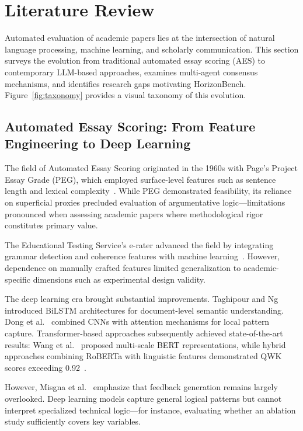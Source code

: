 \section{Literature Review}

Automated evaluation of academic papers lies at the intersection of natural language processing, machine learning, and scholarly communication. This section surveys the evolution from traditional automated essay scoring (AES) to contemporary LLM-based approaches, examines multi-agent consensus mechanisms, and identifies research gaps motivating HorizonBench. Figure~\ref{fig:taxonomy} provides a visual taxonomy of this evolution.

\subsection{Automated Essay Scoring: From Feature Engineering to Deep Learning}

The field of Automated Essay Scoring originated in the 1960s with Page's Project Essay Grade (PEG), which employed surface-level features such as sentence length and lexical complexity~\cite{page1966imminence}. While PEG demonstrated feasibility, its reliance on superficial proxies precluded evaluation of argumentative logic---limitations pronounced when assessing academic papers where methodological rigor constitutes primary value.

The Educational Testing Service's e-rater advanced the field by integrating grammar detection and coherence features with machine learning~\cite{burstein1998automated}. However, dependence on manually crafted features limited generalization to academic-specific dimensions such as experimental design validity.

The deep learning era brought substantial improvements. Taghipour and Ng~\cite{taghipour2016neural} introduced BiLSTM architectures for document-level semantic understanding. Dong et al.~\cite{dong2017attention} combined CNNs with attention mechanisms for local pattern capture. Transformer-based approaches subsequently achieved state-of-the-art results: Wang et al.~\cite{wang2022bert} proposed multi-scale BERT representations, while hybrid approaches combining RoBERTa with linguistic features demonstrated QWK scores exceeding 0.92~\cite{iqbal2024hybrid}.

However, Misgna et al.~\cite{misgna2024survey} emphasize that feedback generation remains largely overlooked. Deep learning models capture general logical patterns but cannot interpret specialized technical logic---for instance, evaluating whether an ablation study sufficiently covers key variables.

